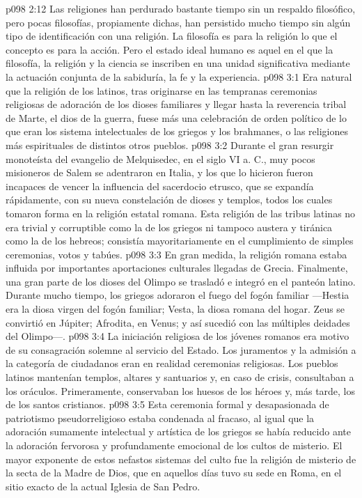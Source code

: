 \vs p098 2:12 \pc Las religiones han perdurado bastante tiempo sin un respaldo filosófico, pero pocas filosofías, propiamente dichas, han persistido mucho tiempo sin algún tipo de identificación con una religión. La filosofía es para la religión lo que el concepto es para la acción. Pero el estado ideal humano es aquel en el que la filosofía, la religión y la ciencia se inscriben en una unidad significativa mediante la actuación conjunta de la sabiduría, la fe y la experiencia.
\vs p098 3:1 Era natural que la religión de los latinos, tras originarse en las tempranas ceremonias religiosas de adoración de los dioses familiares y llegar hasta la reverencia tribal de Marte, el dios de la guerra, fuese más una celebración de orden político de lo que eran los sistema intelectuales de los griegos y los brahmanes, o las religiones más espirituales de distintos otros pueblos.
\vs p098 3:2 Durante el gran resurgir monoteísta del evangelio de Melquisedec, en el siglo VI a. C., muy pocos misioneros de Salem se adentraron en Italia, y los que lo hicieron fueron incapaces de vencer la influencia del sacerdocio etrusco, que se expandía rápidamente, con su nueva constelación de dioses y templos, todos los cuales tomaron forma en la religión estatal romana. Esta religión de las tribus latinas no era trivial y corruptible como la de los griegos ni tampoco austera y tiránica como la de los hebreos; consistía mayoritariamente en el cumplimiento de simples ceremonias, votos y tabúes.
\vs p098 3:3 En gran medida, la religión romana estaba influida por importantes aportaciones culturales llegadas de Grecia. Finalmente, una gran parte de los dioses del Olimpo se trasladó e integró en el panteón latino. Durante mucho tiempo, los griegos adoraron el fuego del fogón familiar ---Hestia era la diosa virgen del fogón familiar; Vesta, la diosa romana del hogar. Zeus se convirtió en Júpiter; Afrodita, en Venus; y así sucedió con las múltiples deidades del Olimpo---.
\vs p098 3:4 La iniciación religiosa de los jóvenes romanos era motivo de su consagración solemne al servicio del Estado. Los juramentos y la admisión a la categoría de ciudadanos eran en realidad ceremonias religiosas. Los pueblos latinos mantenían templos, altares y santuarios y, en caso de crisis, consultaban a los oráculos. Primeramente, conservaban los huesos de los héroes y, más tarde, los de los santos cristianos.
\vs p098 3:5 Esta ceremonia formal y desapasionada de patriotismo pseudorreligioso estaba condenada al fracaso, al igual que la adoración sumamente intelectual y artística de los griegos se había reducido ante la adoración fervorosa y profundamente emocional de los cultos de misterio. El mayor exponente de estos nefastos sistemas del culto fue la religión de misterio de la secta de la Madre de Dios, que en aquellos días tuvo su sede en Roma, en el sitio exacto de la actual Iglesia de San Pedro.
